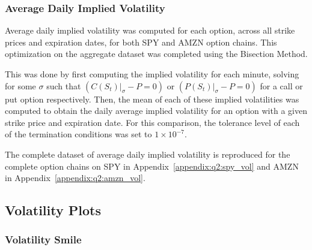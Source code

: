 \documentclass[10pt]{article}
\begin{document}
        \subsubsection{Average Daily Implied Volatility}
        
        Average daily implied volatility was computed for each option, across all strike prices and expiration dates, for both SPY and AMZN option chains. This optimization on the aggregate dataset was completed using the Bisection Method.
        
        This was done by first computing the implied volatility for each minute, solving for some $\sigma$ such that ${(C(S_t) |_{\sigma} - P = 0)}$ or ${(P(S_t) |_{\sigma} - P = 0)}$ for a call or put option respectively. Then, the mean of each of these implied volatilities was computed to obtain the daily average implied volatility for an option with a given strike price and expiration date. For this comparison, the tolerance level of each of the termination conditions was set to $1 \times 10^{-7}$.

        The complete dataset of average daily implied volatility is reproduced for the complete option chains on SPY in Appendix~\ref{appendix:q2:spy_vol} and AMZN in Appendix~\ref{appendix:q2:amzn_vol}.

        
    \subsection{Volatility Plots}
        \subsubsection{Volatility Smile}
        
\end{document}
